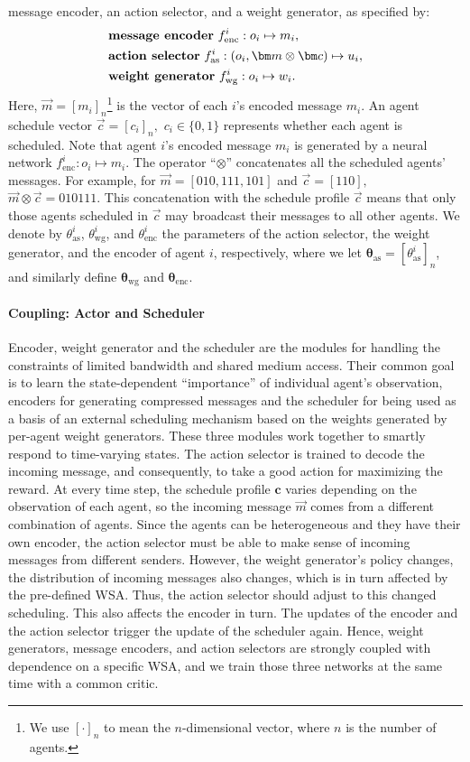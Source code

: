 \documentclass{article} %
\newcommand{\myparagraph}[1]{\vspace{-0.25cm} \paragraph{#1}}
\begin{document}
message encoder, an action selector, and a weight generator, as specified by: 
\begin{align*}
&\text{\bf message encoder} \  f^i_{\text{enc}}: o_i \mapsto m_i, \cr \quad
&\text{\bf action selector} \  f_{\text{as}}^i: (o_i, \vec{m} \otimes \vec{c}) \mapsto u_i, \cr
&\text{\hspace{0cm}} \text{\bf weight generator} \  f_{\text{wg}}^i: o_i \mapsto w_i. 
\end{align*}
Here, $\vec{m} = [m_i]_n$\footnote{We use $[\cdot]_n$ to mean the $n$-dimensional vector, where $n$ is the number of agents.} is the vector of each $i$'s encoded message $m_i.$ An agent schedule vector $\vec{c} = [c_i]_n,$ $c_i \in \{0,1\}$ represents whether each agent is scheduled.
Note that agent $i$'s encoded message
$m_i$ is generated by a neural network $f^i_{\text{enc}}: o_i \mapsto m_i.$ The operator ``$\otimes$'' concatenates all the scheduled agents' messages. For example, 
for $\vec{m} = [010,111,101]$ and $\vec{c} = [110],$ $\vec{m} \otimes \vec{c} = 010111.$ This concatenation with the schedule profile $\vec{c}$ means that 
only those agents scheduled in $\vec{c}$ may broadcast their messages to all other agents. We denote by $\theta^i_{\text{as}}$, $\theta^i_{\text{wg}}$, and $\theta^i_{\text{enc}}$ the parameters of the action selector, the weight generator, and the encoder of agent $i$, respectively, where we let $\bm{\theta}_{\text{as}} = [\theta^i_{\text{as}}]_n$, and similarly define $\bm{\theta}_{\text{wg}}$ and $\bm{\theta}_{\text{enc}}$. 



\myparagraph{Coupling: Actor and Scheduler} 
Encoder, weight generator and the scheduler are the modules for handling the constraints of
limited bandwidth and shared medium access. Their common goal is to
learn the state-dependent ``importance'' of individual agent's
observation, encoders for generating compressed messages and the scheduler for
being used as a basis of an external scheduling mechanism based on the weights generated by per-agent weight generators. These three
modules work together to smartly respond to time-varying states. The
action selector is trained to decode the incoming message, and
consequently, to take a good action for maximizing the reward. At
every time step, the schedule profile ${\bm c}$ varies depending on
the observation of each agent, so the incoming message $\vec{m}$ comes
from a different combination of agents. Since the agents can be
heterogeneous and they have their own encoder, the action selector
must be able to make sense of incoming messages from different
senders. However, the weight generator's policy changes, 
the distribution of incoming messages also changes, which is in turn affected by the pre-defined WSA. Thus, the action
selector should adjust to this changed scheduling. This also affects
the encoder in turn. The updates of the encoder and the action
selector trigger the update of the scheduler again. Hence, 
weight generators, message encoders, and action selectors  
are strongly coupled with dependence on a specific WSA, and we train those three networks at the
same time with a common critic.
\end{document}
